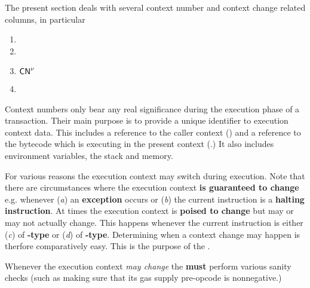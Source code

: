 The present section deals with several context number and context change related columns, in particular
\begin{multicols}{4}
	\begin{enumerate}
		\item \cmc
		\item \cn
		\item $\textsf{CN}^{\nu}$
		\item \caller
	\end{enumerate}
\end{multicols}
Context numbers only bear any real significance during the execution phase of a transaction.
Their main purpose is to provide a unique identifier to execution context data.
This includes a reference to the caller context (\caller) and a reference to the bytecode which is executing in the present context (\cfi.)
It also includes environment variables, the stack and memory.

For various reasons the execution context may switch during execution.
Note that there are circumstances where the execution context \textbf{is guaranteed to change} e.g. whenever
(\emph{a}) an \textbf{exception} occurs or
(\emph{b}) the current instruction is a \textbf{halting instruction}.
At times the execution context is \textbf{poised to change} but may or may not actually change.
This happens whenever the current instruction is either
(\emph{c}) of \textbf{-type} or
(\emph{d}) of \textbf{-type}.
Determining when a context change may happen is therfore comparatively easy.
This is the purpose of the \cmc{}.

\saNote{} Whenever the execution context \emph{may change} the \zkEvm{} \textbf{must} perform various sanity checks (such as making sure that its gas supply pre-opcode is nonnegative.)

